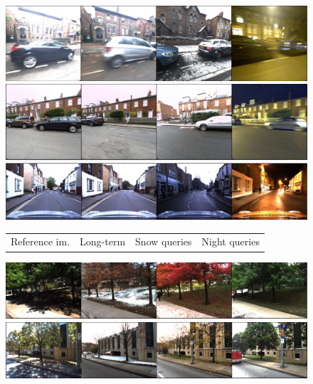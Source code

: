\begin{figure}
	\center


	\begin{minipage}{0.445\linewidth}
		\includegraphics[width=\linewidth]{details/oxf_exs/ex1}
		
		\includegraphics[width=\linewidth]{details/oxf_exs/ex2}
		
		\includegraphics[width=\linewidth]{details/oxf_exs/ex4}
		
		\scriptsize
		\begin{tabularx}{\linewidth}{X X X X}
			Reference im. & 	Long-term & Snow queries & Night queries
		\end{tabularx}
	\end{minipage}\hfill	
	\begin{minipage}{0.545\linewidth}
		\includegraphics[width=\linewidth]{details/cmu_exs/ex1}
		
		\includegraphics[width=\linewidth]{details/cmu_exs/ex6}
		

\end{minipage}
\end{figure}
